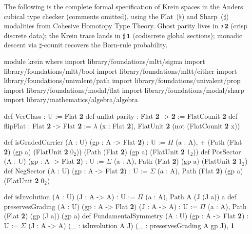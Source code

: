 \documentclass{article}
\begin{document}
The following is the complete formal specification of Krein spaces in the Anders
cubical type checker (comments omitted), using the Flat~($\flat$) and
Sharp~($\sharp$) modalities from Cohesive Homotopy Type Theory.
Ghost parity lives in $\flat\,\mathbf{2}$ (crisp discrete data);
the Krein trace lands in $\sharp\,\mathbf{1}$ (codiscrete global sections);
monadic descent via $\sharp$-counit recovers the Born-rule probability.

\bigskip
\begingroup
\fontsize{7.2}{9}\selectfont
\ttfamily
\setlength{\parindent}{0pt}
\obeylines
\obeyspaces
module krein where
import library/foundations/mltt/sigma
import library/foundations/mltt/bool
import library/foundations/mltt/either
import library/foundations/univalent/path
import library/foundations/univalent/prop
import library/foundations/modal/flat
import library/foundations/modal/sharp
import library/mathematics/algebra/algebra

def VecClass : U := Flat \textbf{2}
def unflat-parity : Flat \textbf{2} -> \textbf{2} := FlatCounit \textbf{2}
def flipFlat : Flat \textbf{2} -> Flat \textbf{2}
\hspace*{1.5em}:= $\lambda$ (x : Flat \textbf{2}), FlatUnit \textbf{2} (not (FlatCounit \textbf{2} x))

def isGradedCarrier (A : U) (gp : A -> Flat \textbf{2}) : U
\hspace*{1.5em}:= $\Pi$ (a : A), + (Path (Flat \textbf{2}) (gp a) (FlatUnit \textbf{2} 0$_2$))
\hspace*{5.2em}(Path (Flat \textbf{2}) (gp a) (FlatUnit \textbf{2} 1$_2$))
def PosSector (A : U) (gp : A -> Flat \textbf{2}) : U
\hspace*{1.5em}:= $\Sigma$ (a : A), Path (Flat \textbf{2}) (gp a) (FlatUnit \textbf{2} 1$_2$)
def NegSector (A : U) (gp : A -> Flat \textbf{2}) : U
\hspace*{1.5em}:= $\Sigma$ (a : A), Path (Flat \textbf{2}) (gp a) (FlatUnit \textbf{2} 0$_2$)

def isInvolution (A : U) (J : A -> A) : U
\hspace*{1.5em}:= $\Pi$ (a : A), Path A (J (J a)) a
def preservesGrading (A : U) (gp : A -> Flat \textbf{2}) (J : A -> A) : U
\hspace*{1.5em}:= $\Pi$ (a : A), Path (Flat \textbf{2}) (gp (J a)) (gp a)
def FundamentalSymmetry (A : U) (gp : A -> Flat \textbf{2}) : U
\hspace*{1.5em}:= $\Sigma$ (J : A -> A)
\hspace*{3.5em}(\_ : isInvolution A J)
\hspace*{3.5em}(\_ : preservesGrading A gp J), \textbf{1}
\end{document}
